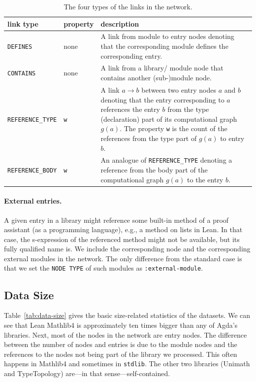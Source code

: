 \documentclass{article}
\begin{document}
\begin{table}[t]
    \caption{The four types of the links in the network.\label{tab:link-types}}
    \begin{center}
        \begin{tabular}{l|l|p{8cm}}
            link type & property  & description  \\
            \hline
            \texttt{DEFINES} & none &
            A link from module to entry nodes denoting that the corresponding module defines the corresponding entry.\\
            \rule{0pt}{3ex}
            \texttt{CONTAINS} & none &
            A link from a library/ module node that contains another (sub-)module node.\\
            \rule{0pt}{3ex}
            \texttt{REFERENCE\_TYPE} & \texttt{w} &
            A link $a\to b$ between two entry nodes $a$ and $b$ denoting that the entry corresponding to $a$ references the entry $b$ from the type (declaration) part of its computational graph $g(a)$. The property \texttt{w} is the count of the references from the type part of $g(a)$ to entry $b$.\\
            \rule{0pt}{3ex}
            \texttt{REFERENCE\_BODY} &\texttt{w} &
            An analogue of \texttt{REFERENCE\_TYPE} denoting a reference from the body part of the computational graph $g(a)$ to the entry $b$.
        \end{tabular}
    \end{center}
\end{table}

\paragraph{External entries.} A given entry in a library might reference some built-in method of a proof assistant (as a programming language), e.g., a method on lists in Lean. In that case, the s-expression of the referenced method might not be available, but its fully qualified name is. We include the corresponding node and the corresponding external modules in the network. The only difference from the standard case is that we set the \texttt{NODE TYPE} of such modules as \texttt{:external-module}.

\subsection{Data Size}
Table~\ref{tab:data-size} gives the basic size-related statistics of the datasets. We can see that Lean Mathlib4 is approximately ten times bigger than any of Agda's libraries.
Next, most of the nodes in the network are entry nodes. The difference between the number of nodes and entries is due to the module nodes and the references to the nodes not being part of the library we processed. This often happens in Mathlib4 and sometimes in \texttt{stdlib}. The other two libraries (Unimath and TypeTopology) are---in that sense---self-contained.
\end{document}
